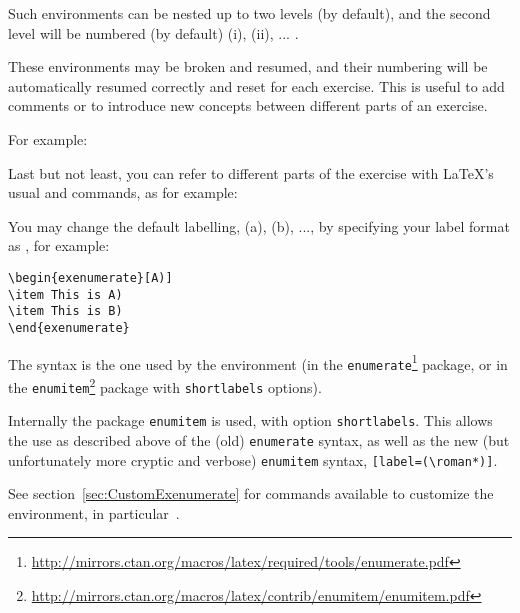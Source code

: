 \documentclass[11pt,a4paper]{article}
\begin{document}
Such  environments can be nested up to two levels (by default), and
the second level will be numbered (by default) (i), (ii), ... .

These environments may be broken and resumed, and their numbering will be automatically
resumed correctly and reset for each exercise. This is useful to add comments or to
introduce new concepts between different parts of an exercise.

For example:
\begin{pkgverbatim}
%
\end{pkgverbatim}

Last but not least, you can refer to different parts of the exercise with \LaTeX's usual
 and 
commands, as for example:
\begin{pkgverbatim}
%
\end{pkgverbatim}

You may change the default labelling, (a), (b), ..., by specifying your label format as
, for example:
\begin{pkgverbatim}
\begin{verbatim}
\begin{exenumerate}[A)]
\item This is A)
\item This is B)
\end{exenumerate}
\end{verbatim}
\end{pkgverbatim}
The syntax is the one used by the  environment (in the
\texttt{enumerate}\footnote{\url{http://mirrors.ctan.org/macros/latex/required/tools/enumerate.pdf}}
package, or in the
\texttt{enumitem}\footnote{\url{http://mirrors.ctan.org/macros/latex/contrib/enumitem/enumitem.pdf}}
package with \texttt{shortlabels} options).

\begin{pkgtip}
  Internally the package \texttt{enumitem} is used, with option \texttt{shortlabels}. This
  allows the use as described above of the (old) \texttt{enumerate} syntax, as well as the
  new (but unfortunately more cryptic and verbose) \texttt{enumitem} syntax,
  \texttt{[label=(\textbackslash roman*)]}.

  See section~\ref{sec:CustomExenumerate} for commands available to customize the
   environment, in particular~.
\end{pkgtip}
\end{document}
